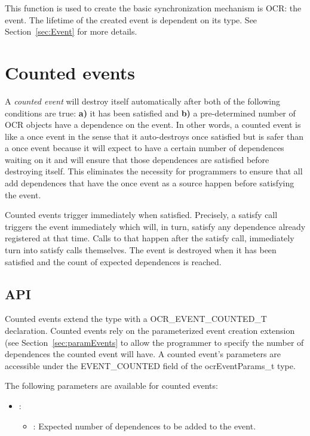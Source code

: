 \descr
This function is used to create the basic synchronization mechanism is
OCR: the event. The lifetime of the created event is dependent on its
type. See Section~\ref{sec:Event} for more details.

\section{Counted events}
\label{sec:countedEvents}
A \emph{counted event} will destroy itself
automatically after both of the following conditions are true: {\bf
  a)} it has been satisfied and {\bf b)} a pre-determined number of
OCR objects have a dependence on the event. In other words, a counted
event is like a once event in the sense that it auto-destroys once
satisfied but is safer than a once event because it will expect to
have a certain number of dependences waiting on it and will ensure
that those dependences are satisfied before destroying itself. This
eliminates the necessity for programmers to ensure that all add
dependences that have the once event as a source happen before
satisfying the event.

Counted events trigger immediately when satisfied. Precisely, a
satisfy call triggers the event immediately which will, in turn,
satisfy any dependence already registered at that time. Calls to
\hyperlink{func_ocrAddDependence}{} that happen
after the satisfy call, immediately turn into satisfy calls
themselves. The event is destroyed when it has been satisfied and the
count of expected dependences is reached.

\subsection{API}

Counted events extend the
\hypertarget{type_ocrEventTypes_t}{} type
with a OCR\_EVENT\_COUNTED\_T declaration. Counted events rely on the
parameterized event creation extension (see
Section~\ref{sec:paramEvents} to allow the programmer to
specify the number of dependences the counted event will have. A
counted event's parameters are accessible under the EVENT\_COUNTED field
of the ocrEventParams\_t type.

The following parameters are available for counted events:
\begin{itemize}
\item {}:
\begin{itemize}
\item {}: Expected number of dependences to be added to the event.
\end{itemize}
\end{itemize}

